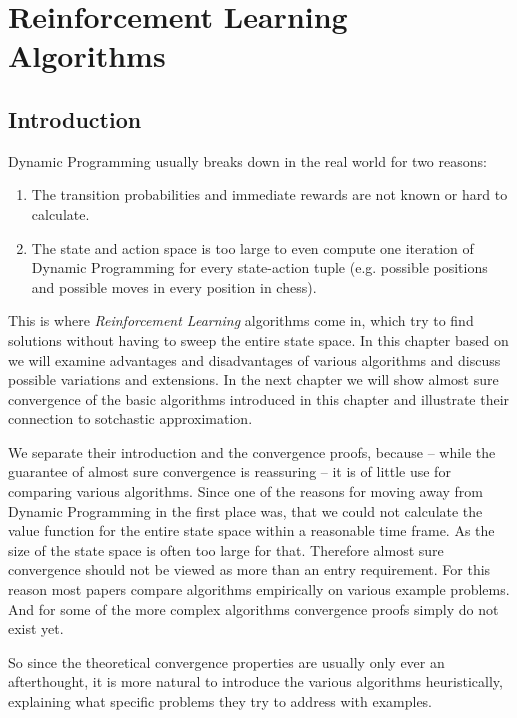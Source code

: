 
\chapter{Reinforcement Learning Algorithms}

\section{Introduction}

Dynamic Programming usually breaks down in the real world for two reasons:
\begin{enumerate}
    \item The transition probabilities and immediate rewards are not known or hard to calculate.
    \item The state and action space is too large to even compute one iteration of Dynamic Programming for every state-action tuple (e.g. possible positions and possible moves in every position in chess).
\end{enumerate}

This is where \emph{Reinforcement Learning} algorithms come in, which try to find solutions without having to sweep the entire state space. In this chapter based on \textcite{suttonReinforcementLearningIntroduction2018a} we will examine advantages and disadvantages of various algorithms and discuss possible variations and extensions. In the next chapter we will show almost sure convergence of the basic algorithms introduced in this chapter and illustrate their connection to sotchastic approximation.  

We separate their introduction and the convergence proofs, because -- while the guarantee of almost sure convergence is reassuring -- it is of little use for comparing various algorithms. Since one of the reasons for moving away from Dynamic Programming in the first place was, that we could not calculate the value function for the entire state space within a reasonable time frame. As the size of the state space is often too large for that.  Therefore almost sure convergence should not be viewed as more than an entry requirement. For this reason most papers compare algorithms empirically on various example problems. And for some of the more complex algorithms convergence proofs simply do not exist yet. 

So since the theoretical convergence properties are usually only ever an afterthought, it is more natural to introduce the various algorithms heuristically, explaining what specific problems they try to address with examples.


